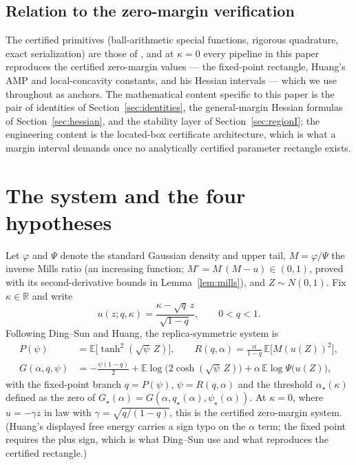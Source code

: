 \documentclass[11pt]{article}
\theoremstyle{remark}
\newcommand{\E}{\mathbb{E}}
\newcommand{\R}{\mathbb{R}}
\begin{document}
\subsection*{Relation to the zero-margin verification}

The certified primitives (ball-arithmetic special functions, rigorous
quadrature, exact serialization) are those of
\cite{shmalo2026capacity}, and at $\kappa=0$ every pipeline in this
paper reproduces the certified zero-margin values --- the fixed-point
rectangle, Huang's AMP and local-concavity constants, and his
Hessian intervals --- which we use throughout as anchors.  The
mathematical content specific to this paper is the pair of identities
of Section~\ref{sec:identities}, the general-margin Hessian formulas
of Section~\ref{sec:hessian}, and the stability layer of
Section~\ref{sec:regionI}; the engineering content is the located-box
certificate architecture, which is what a margin interval demands
once no analytically certified parameter rectangle exists.

\section{The system and the four hypotheses}\label{sec:system}

Let $\varphi$ and $\Psi$ denote the standard Gaussian density and
upper tail, $M=\varphi/\Psi$ the inverse Mills ratio (an increasing
function; $M'=M\,(M-u)\in(0,1)$, proved with its second-derivative
bounds in Lemma~\ref{lem:mills}), and $Z\sim N(0,1)$.  Fix
$\kappa\in\R$ and write
\[
u(z;q,\kappa)=\frac{\kappa-\sqrt{q}\,z}{\sqrt{1-q}},\qquad 0<q<1 .
\]
Following Ding--Sun and Huang, the replica-symmetric system is
\begin{align}
P(\psi)&=\E\bigl[\tanh^2(\sqrt{\psi}\,Z)\bigr],\qquad
R(q,\alpha)=\frac{\alpha}{1-q}\,\E\bigl[M(u(Z))^2\bigr],
\label{eq:PR}\\
G(\alpha,q,\psi)&=-\frac{\psi(1-q)}{2}
+\E\log\bigl(2\cosh(\sqrt{\psi}\,Z)\bigr)
+\alpha\,\E\log\Psi\bigl(u(Z)\bigr),
\label{eq:G}
\end{align}
with the fixed-point branch $q=P(\psi)$, $\psi=R(q,\alpha)$ and the
threshold $\alpha_\star(\kappa)$ defined as the zero of
$G_\star(\alpha)=G(\alpha,q_\star(\alpha),\psi_\star(\alpha))$.  At
$\kappa=0$, where $u=-\gamma z$ in law with $\gamma=\sqrt{q/(1-q)}$,
this is the certified zero-margin system.  (Huang's displayed
free energy carries a sign typo on the $\alpha$ term; the fixed point
requires the plus sign, which is what Ding--Sun use and what
reproduces the certified rectangle.)
\end{document}
